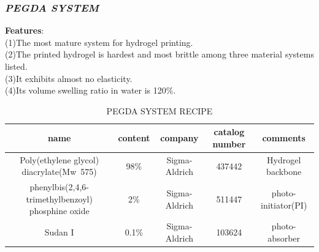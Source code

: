 \documentclass[a4paper]{article}
\begin{document}
\begin{itemize}
\subsubsection{\textit{PEGDA SYSTEM}}
\textbf{Features}:\\
(1)The most mature system for hydrogel printing.\\
(2)The printed hydrogel is hardest and most brittle among three material systems listed.  \\
(3)It exhibits almost no elasticity. \\
(4)Its volume swelling ratio in water is 120\%.\\
\begin{table}[h!]
\caption{PEGDA SYSTEM RECIPE}
\begin{center}
    \begin{tabular}{ | c | c | c | c | c |}
    \hline
    \textbf{name}&\textbf{content}&\textbf{company}&\textbf{catalog number}&\textbf{comments} \\ \hline
    Poly(ethylene glycol) diacrylate(Mw~575)&98\%&Sigma-Aldrich&437442&Hydrogel backbone\\     \hline
    phenylbis(2,4,6-trimethylbenzoyl) phosphine                            oxide&2\%&Sigma-Aldrich&511447&photo-initiator(PI)\\
    \hline
    Sudan I&0.1\%&Sigma-Aldrich&103624&photo-absorber \\
    \hline
    \end{tabular}
\end{center}
\end{table}

\end{itemize}
\end{document}
